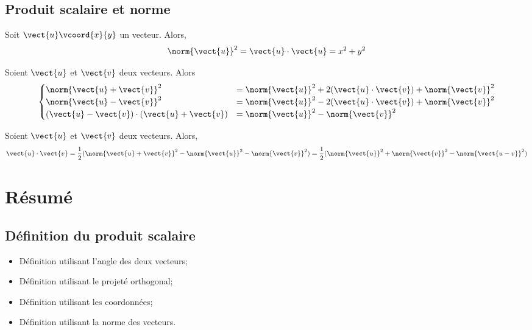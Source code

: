\documentclass{article}
\begin{document}
\subsection{Produit scalaire et norme}
\begin{proposition}
Soit $\vect{u}\vcoord{x}{y}$ un vecteur. Alors,
\begin{equation*}
\norm{\vect{u}}^2 = \vect{u} \cdot \vect{u} = x^2 + y^2
\end{equation*}
\end{proposition}
\begin{proposition}
Soient $\vect{u}$ et $\vect{v}$ deux vecteurs. Alors
\begin{equation*}
\begin{cases}
\norm{\vect{u} + \vect{v}}^2 &= \norm{\vect{u}}^2 + 2(\vect{u} \cdot \vect{v})+ \norm{\vect{v}}^2\\
\norm{\vect{u} - \vect{v}}^2 &= \norm{\vect{u}}^2 - 2(\vect{u} \cdot \vect{v})+ \norm{\vect{v}}^2\\
(\vect{u} - \vect{v}) \cdot (\vect{u} + \vect{v}) &= \norm{\vect{u}}^2 - \norm{\vect{v}}^2
\end{cases}
\end{equation*}
\end{proposition}
\begin{tcolorbox}
\begin{proposition}
Soient $\vect{u}$ et $\vect{v}$ deux vecteurs. Alors,
\begin{equation*}
\vect{u} \cdot \vect{v} = \dfrac{1}{2}(\norm{\vect{u} + \vect{v}}^2 - \norm{\vect{u}}^2 - \norm{\vect{v}}^2) = \dfrac{1}{2}(\norm{\vect{u}}^2 + \norm{\vect{v}}^2 - \norm{\vect{u - v}}^2)
\end{equation*}
\end{proposition}
\end{tcolorbox}
\newpage
\section{Résumé}
\subsection{Définition du produit scalaire}
\begin{itemize}
\item Définition utilisant l'angle des deux vecteurs;
\item Définition utilisant le projeté orthogonal;
\item Définition utilisant les coordonnées;
\item Définition utilisant la norme des vecteurs.
\end{itemize}
\end{document}
